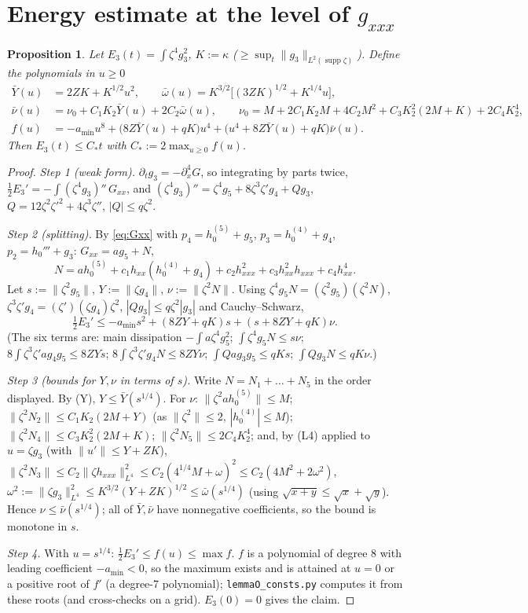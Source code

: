 \documentclass[11pt]{article}
\newtheorem{proposition}[theorem]{Proposition}
\theoremstyle{remark}\newtheorem{remark}[theorem]{Remark}
\newcommand{\nrm}[1]{\lVert #1\rVert}
\begin{document}
\section{Energy estimate at the level of $g_{xxx}$}
\begin{proposition}\label{prop:E3}
Let $E_3(t)=\int\zeta^4g_3^2$, $K:=\kappa$ ($\ge\sup_t\nrm{g_3}_{L^2(\operatorname{supp}\zeta)}$). Define the polynomials in $u\ge0$
\begin{align*}
\bar Y(u)&=2ZK+K^{1/2}u^2,\qquad \bar\omega(u)=K^{3/2}\big[(3ZK)^{1/2}+K^{1/4}u\big],\\
\bar\nu(u)&=\nu_0+C_1K_2\bar Y(u)+2C_2\bar\omega(u),\qquad \nu_0=M+2C_1K_2M+4C_2M^2+C_3K_2^2(2M+K)+2C_4K_2^4,\\
f(u)&=-a_{\min}u^8+\big(8Z\bar Y(u)+qK\big)u^4+\big(u^4+8Z\bar Y(u)+qK\big)\bar\nu(u).
\end{align*}
Then $E_3(t)\le C_*t$ with $C_*:=2\max_{u\ge0}f(u)$.
\end{proposition}
\begin{proof}
\emph{Step 1 (weak form).} $\partial_tg_3=-\partial_x^4G$, so integrating by parts twice, $\tfrac12E_3'=-\int(\zeta^4g_3)''\,G_{xx}$, and $(\zeta^4g_3)''=\zeta^4g_5+8\zeta^3\zeta'g_4+Qg_3$, $Q=12\zeta^2\zeta'^2+4\zeta^3\zeta''$, $|Q|\le q\zeta^2$.

\emph{Step 2 (splitting).} By \eqref{eq:Gxx} with $p_4=h_0^{(5)}+g_5$, $p_3=h_0^{(4)}+g_4$, $p_2=h_0'''+g_3$: $G_{xx}=ag_5+N$,
\[
N=ah_0^{(5)}+c_1h_{xx}(h_0^{(4)}+g_4)+c_2h_{xxx}^2+c_3h_{xx}^2h_{xxx}+c_4h_{xx}^4 .
\]
Let $s:=\nrm{\zeta^2g_5}$, $Y:=\nrm{\zeta g_4}$, $\nu:=\nrm{\zeta^2N}$. Using $\zeta^4g_5N=(\zeta^2g_5)(\zeta^2N)$, $\zeta^3\zeta'g_4=(\zeta' )(\zeta g_4)\zeta^2$, $|Q g_3|\le q\zeta^2|g_3|$ and Cauchy--Schwarz,
\[
\tfrac12E_3'\le-a_{\min}s^2+(8ZY+qK)s+(s+8ZY+qK)\nu .
\]
(The six terms are: main dissipation $-\int a\zeta^4g_5^2$; $\int\zeta^4g_5N\le s\nu$; $8\int\zeta^3\zeta'ag_4g_5\le8ZYs$; $8\int\zeta^3\zeta'g_4N\le8ZY\nu$; $\int Qag_3g_5\le qKs$; $\int Qg_3N\le qK\nu$.)

\emph{Step 3 (bounds for $Y,\nu$ in terms of $s$).} Write $N=N_1+\dots+N_5$ in the order displayed. By (Y), $Y\le\bar Y(s^{1/4})$. For $\nu$: $\nrm{\zeta^2ah_0^{(5)}}\le M$; $\nrm{\zeta^2N_2}\le C_1K_2(2M+Y)$ (as $\nrm{\zeta^2}\le2$, $|h_0^{(4)}|\le M$); $\nrm{\zeta^2N_4}\le C_3K_2^2(2M+K)$; $\nrm{\zeta^2N_5}\le2C_4K_2^4$; and, by (L4) applied to $u=\zeta g_3$ (with $\nrm{u'}\le Y+ZK$),
$\nrm{\zeta^2N_3}\le C_2\nrm{\zeta h_{xxx}}_{L^4}^2\le C_2(4^{1/4}M+\omega)^2\le C_2(4M^2+2\omega^2)$, $\omega^2:=\nrm{\zeta g_3}_{L^4}^2\le K^{3/2}(Y+ZK)^{1/2}\le\bar\omega(s^{1/4})$ (using $\sqrt{x+y}\le\sqrt x+\sqrt y$). Hence $\nu\le\bar\nu(s^{1/4})$; all of $\bar Y,\bar\nu$ have nonnegative coefficients, so the bound is monotone in $s$.

\emph{Step 4.} With $u=s^{1/4}$: $\frac12E_3'\le f(u)\le\max f$. $f$ is a polynomial of degree 8 with leading coefficient $-a_{\min}<0$, so the maximum exists and is attained at $u=0$ or a positive root of $f'$ (a degree-7 polynomial); \texttt{lemmaO\_consts.py} computes it from these roots (and cross-checks on a grid). $E_3(0)=0$ gives the claim.
\end{proof}
\end{document}
